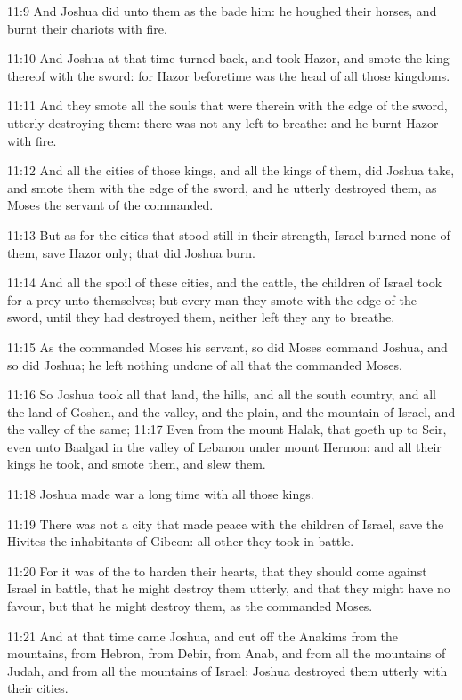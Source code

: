 11:9 And Joshua did unto them as the \LORD bade him: he houghed their
horses, and burnt their chariots with fire.

11:10 And Joshua at that time turned back, and took Hazor, and smote
the king thereof with the sword: for Hazor beforetime was the head of
all those kingdoms.

11:11 And they smote all the souls that were therein with the edge of
the sword, utterly destroying them: there was not any left to breathe:
and he burnt Hazor with fire.

11:12 And all the cities of those kings, and all the kings of them,
did Joshua take, and smote them with the edge of the sword, and he
utterly destroyed them, as Moses the servant of the \LORD commanded.

11:13 But as for the cities that stood still in their strength, Israel
burned none of them, save Hazor only; that did Joshua burn.

11:14 And all the spoil of these cities, and the cattle, the children
of Israel took for a prey unto themselves; but every man they smote
with the edge of the sword, until they had destroyed them, neither
left they any to breathe.

11:15 As the \LORD commanded Moses his servant, so did Moses command
Joshua, and so did Joshua; he left nothing undone of all that the \LORD
commanded Moses.

11:16 So Joshua took all that land, the hills, and all the south
country, and all the land of Goshen, and the valley, and the plain,
and the mountain of Israel, and the valley of the same; 11:17 Even
from the mount Halak, that goeth up to Seir, even unto Baalgad in the
valley of Lebanon under mount Hermon: and all their kings he took, and
smote them, and slew them.

11:18 Joshua made war a long time with all those kings.

11:19 There was not a city that made peace with the children of
Israel, save the Hivites the inhabitants of Gibeon: all other they
took in battle.

11:20 For it was of the \LORD to harden their hearts, that they should
come against Israel in battle, that he might destroy them utterly, and
that they might have no favour, but that he might destroy them, as the
\LORD commanded Moses.

11:21 And at that time came Joshua, and cut off the Anakims from the
mountains, from Hebron, from Debir, from Anab, and from all the
mountains of Judah, and from all the mountains of Israel: Joshua
destroyed them utterly with their cities.

